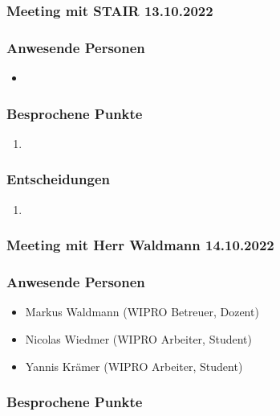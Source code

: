 \documentclass[a4paper, table]{article}
\begin{document}
\newpage
\subsubsection{Meeting mit STAIR 13.10.2022}

\subsubsection*{Anwesende Personen}

\begin{itemize}
    \item 
\end{itemize}

\subsubsection*{Besprochene Punkte}

\begin{enumerate}
    \item 
\end{enumerate}

\subsubsection*{Entscheidungen}

\begin{enumerate}
    \item 
\end{enumerate}

\newpage
\subsubsection{Meeting mit Herr Waldmann 14.10.2022}

\subsubsection*{Anwesende Personen}

\begin{itemize}
    \item Markus Waldmann (WIPRO Betreuer, Dozent)
    \item Nicolas Wiedmer (WIPRO Arbeiter, Student)
    \item Yannis Krämer (WIPRO Arbeiter, Student)
\end{itemize}

\subsubsection*{Besprochene Punkte}
\end{document}
